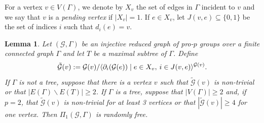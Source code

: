 \documentclass[a4paper,10pt]{amsart}
\theoremstyle{plain}
\newtheorem{lemma}[thm]{Lemma}
\theoremstyle{definition}
\numberwithin{equation}{section}
\begin{document}
For a vertex $v \in V(\Gamma)$, we denote by $X_v$ the set of edges in $\Gamma$ incident to $v$ and we say that $v$ is a \emph{pending vertex} if $|X_v|=1$. If $e \in X_v$, let $J(v,e) \subseteq \{0,1\}$ be the set of indices $i$ such that $d_{i}(e)=v$.

\begin{lemma}\label{cor:graphs}
    Let $(\mathcal G, \Gamma)$ be an injective reduced graph of pro-$p$ groups over a finite connected graph $\Gamma$ and let $T$ be a maximal subtree of $\Gamma$. Define
    \[\tilde{\mathcal G}(v):=\mathcal G(v)/\langle \partial_i(\mathcal G(e)) \mid e \in X_v,\hspace{0.2em} i \in J(v,e)\rangle^{\mathcal G(v)}.\]
    If $\Gamma$ is not a tree, suppose that there is a vertex $v$ such that $\tilde{\mathcal G}(v)$ is non-trivial or that $|E(\Gamma) \smallsetminus E(T)| \geq 2$. If $\Gamma$ is a tree, suppose that $|V(\Gamma)|\geq 2$ and, if $p=2$, that $\tilde{\mathcal G}(v)$ is non-trivial for at least 3 vertices or that $|\tilde{\mathcal G}(v)| \geq 4$ for one vertex.
    Then $\Pi_1 (\mathcal G, \Gamma)$ is randomly free.
\end{lemma}
\end{document}

